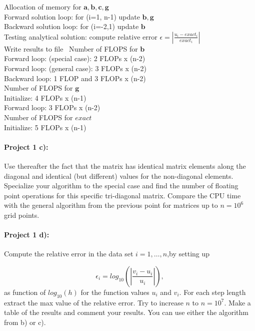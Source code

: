 \documentclass[%
oneside,                 %
final,                   %
10pt]{article}
\begin{document}
Allocation of memory for $ \mathbf{a}, \mathbf{b}, \mathbf{c}, \mathbf{g}$ \\
Forward solution loop: for (i=1, n-1) update $\mathbf{b}, \mathbf{g}$ \\
Backward solution loop: for (i=-2,1) update $\mathbf{b}$ \\
Testing analytical solution: compute relative error $  \epsilon =  \left\lvert \frac{u_i-exact_i}{exact_i} \right\rvert$ \\
Write results to file \
Number of FLOPS for $\mathbf{b}$ \\
Forward loop: (special case): 2 FLOPs x (n-2) \\
Forward loop: (general case): 3 FLOPs x (n-2) \\
Backward loop: 1 FLOP and 3 FLOPs x (n-2) \\

Number of FLOPS for $\mathbf{g}$ \\
Initialize: 4 FLOPs x (n-1) \\
Forward loop: 3 FLOPs x (n-2)\\
Number of FLOPS for $exact$\\
Initialize: 5 FLOPs x (n-1)

\paragraph{Project 1 c):}
Use thereafter the fact that the matrix has identical matrix elements along the diagonal and identical (but different) values for the non-diagonal elements. Specialize your algorithm to the special case and find the number of floating point operations
for this specific tri-diagonal matrix. Compare the CPU time with the general algorithm from the previous point for matrices up to  $n=10^6$ grid points. 

\paragraph{Project 1 d):}
Compute the relative error  in the data set $i=1,\dots, n$,by setting up

\[
   \epsilon_i=log_{10}\left(\left|\frac{v_i-u_i}
                 {u_i}\right|\right),
\]
as function of $log_{10}(h)$ for the function values $u_i$ and $v_i$.
For each step length extract the max value of the relative error.  
Try to increase $n$ to $n=10^7$.  Make a table of the results and 
comment your results. You can use either the algorithm from b) or c). 
\end{document}
